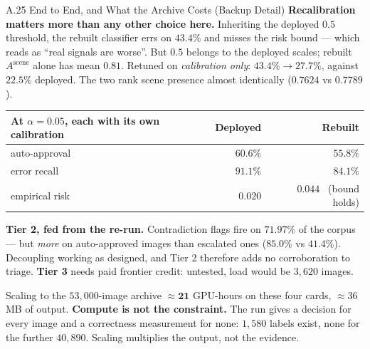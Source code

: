 \documentclass[aspectratio=169,11pt]{beamer}
\begin{document}
\begin{frame}{A.25 End to End, and What the Archive Costs (Backup Detail)}
\scriptsize
\textbf{Recalibration matters more than any other choice here.} Inheriting the deployed $0.5$ threshold, the rebuilt classifier errs on $43.4\%$ and misses the risk bound --- which reads as ``real signals are worse''. But $0.5$ belongs to the deployed scales; rebuilt $A^{\text{scene}}$ alone has mean $0.81$. Retuned on \emph{calibration only}: $43.4\%\rightarrow\mathbf{27.7\%}$, against $22.5\%$ deployed. The two rank scene presence almost identically ($0.7624$ vs $0.7789$).
\vspace{1mm}
\begin{center}\footnotesize
\begin{tabular}{@{}l r r@{}}
\toprule
\textbf{At $\alpha=0.05$, each with its own calibration} & \textbf{Deployed} & \textbf{Rebuilt} \\
\midrule
auto-approval & $60.6\%$ & $\mathbf{55.8\%}$ \\
error recall & $91.1\%$ & $\mathbf{84.1\%}$ \\
empirical risk & $0.020$ & $0.044$ \ (bound holds) \\
\bottomrule
\end{tabular}
\end{center}
\vspace{1mm}

\textbf{Tier 2, fed from the re-run.} Contradiction flags fire on $71.97\%$ of the corpus --- but \emph{more} on auto-approved images than escalated ones ($85.0\%$ vs $41.4\%$). Decoupling working as designed, and Tier 2 therefore adds no corroboration to triage. \textbf{Tier 3} needs paid frontier credit: untested, load would be $3{,}620$ images.
\vspace{1mm}

\begin{alertblock}{\scriptsize Scaling to the $53{,}000$-image archive}
\scriptsize $\approx\mathbf{21}$ GPU-hours on these four cards, $\approx36$\,MB of output. \textbf{Compute is not the constraint.} The run gives a decision for every image and a correctness measurement for none: $1{,}580$ labels exist, none for the further $40{,}890$. Scaling multiplies the output, not the evidence.
\end{alertblock}
\end{frame}
\end{document}
